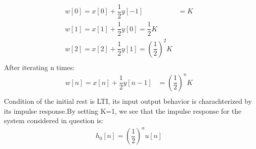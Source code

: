 \documentclass[10pt,a4paper, margin=1in]{article}
\begin{document}
\begin{enumerate}
\begin{enumerate}
	\begin{equation}
	\begin{split}
	 w[0] = x[0] + \dfrac{1}{2}y[-1] &= K \\
	 w[1] = x[1] + \dfrac{1}{2}y[0] = \dfrac{1}{2}K  \\
	 w[2] = x[2] + \dfrac{1}{2}y[1] = (\dfrac{1}{2})^2 K \\
	\end{split}
	\end{equation}
	After iterating n times:\\
	\begin{equation}
	\begin{split}
	 w[n] = x[n] + \dfrac{1}{2}y[n-1] &= (\dfrac{1}{2})^n K\\
	\end{split}
	\end{equation}
	Condition of the initial rest is LTI, its input output behavior is charachterized by its impulse response.By setting K=1, we see that the impulse response for the system considered in question is: \\
	\begin{equation}
	\begin{split}
	 h_0[n] = (\dfrac{1}{2})^n u[n] \\
	\end{split}
	\end{equation}
	

\end{enumerate}
\end{enumerate}
\end{document}
